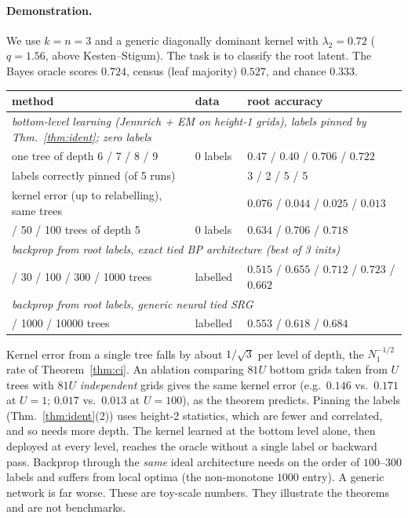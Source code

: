 \documentclass[11pt]{article}
\theoremstyle{definition}
\begin{document}
\paragraph{Demonstration.} We use $k=n=3$ and a generic diagonally dominant kernel with
$\lambda_2=0.72$ ($q=1.56$, above Kesten--Stigum). The task is to classify the root latent.
The Bayes oracle scores $0.724$, census (leaf majority) $0.527$, and chance $0.333$.
\begin{center}\begin{tabular}{lll}\toprule
method & data & root accuracy\\\midrule
\multicolumn{3}{l}{\emph{bottom-level learning (Jennrich + EM on height-1 grids), labels pinned by Thm.~\ref{thm:ident}; zero labels}}\\
\quad one tree of depth 6 / 7 / 8 / 9 & $0$ labels & $0.47$ / $0.40$ / $0.706$ / $\mathbf{0.722}$\\
\quad labels correctly pinned (of 5 runs) & & 3 / 2 / 5 / 5\\
\quad kernel error (up to relabelling), same trees & & $0.076$ / $0.044$ / $0.025$ / $0.013$\\
\quad 20 / 50 / 100 trees of depth 5 & $0$ labels & $0.634$ / $0.706$ / $0.718$\\
\multicolumn{3}{l}{\emph{backprop from root labels, exact tied BP architecture (best of 3 inits)}}\\
\quad 10 / 30 / 100 / 300 / 1000 trees & labelled & $0.515$ / $0.655$ / $0.712$ / $0.723$ / $0.662$\\
\multicolumn{3}{l}{\emph{backprop from root labels, generic neural tied SRG}}\\
\quad 100 / 1000 / 10000 trees & labelled & $0.553$ / $0.618$ / $0.684$\\
\bottomrule\end{tabular}\end{center}
Kernel error from a single tree falls by about $1/\sqrt3$ per level of depth, the $N_1^{-1/2}$
rate of Theorem~\ref{thm:ci}. An ablation comparing $81U$ bottom grids taken from $U$ trees with
$81U$ \emph{independent} grids gives the same kernel error (e.g.\ $0.146$ vs.\ $0.171$ at
$U=1$; $0.017$ vs.\ $0.013$ at $U=100$), as the theorem predicts. Pinning the labels
(Thm.~\ref{thm:ident}(2)) uses height-2 statistics, which are fewer and correlated, and so needs
more depth. The kernel learned at the bottom level alone, then deployed at every level, reaches
the oracle without a single label or backward pass. Backprop through the \emph{same} ideal
architecture needs on the order of $100$--$300$ labels and suffers from local optima (the
non-monotone $1000$ entry). A generic network is far worse. These are toy-scale numbers. They
illustrate the theorems and are not benchmarks.
\end{document}
